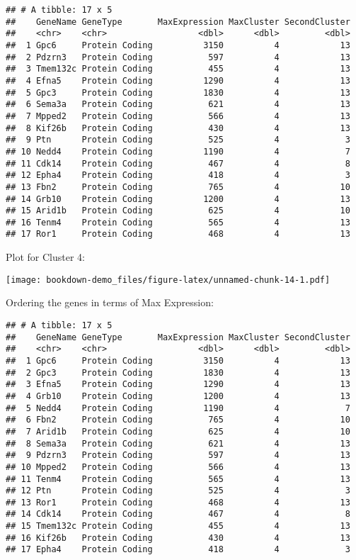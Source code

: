 \documentclass[
]{book}
\begin{document}
\begin{verbatim}
## # A tibble: 17 x 5
##    GeneName GeneType       MaxExpression MaxCluster SecondCluster
##    <chr>    <chr>                  <dbl>      <dbl>         <dbl>
##  1 Gpc6     Protein Coding          3150          4            13
##  2 Pdzrn3   Protein Coding           597          4            13
##  3 Tmem132c Protein Coding           455          4            13
##  4 Efna5    Protein Coding          1290          4            13
##  5 Gpc3     Protein Coding          1830          4            13
##  6 Sema3a   Protein Coding           621          4            13
##  7 Mpped2   Protein Coding           566          4            13
##  8 Kif26b   Protein Coding           430          4            13
##  9 Ptn      Protein Coding           525          4             3
## 10 Nedd4    Protein Coding          1190          4             7
## 11 Cdk14    Protein Coding           467          4             8
## 12 Epha4    Protein Coding           418          4             3
## 13 Fbn2     Protein Coding           765          4            10
## 14 Grb10    Protein Coding          1200          4            13
## 15 Arid1b   Protein Coding           625          4            10
## 16 Tenm4    Protein Coding           565          4            13
## 17 Ror1     Protein Coding           468          4            13
\end{verbatim}

Plot for Cluster 4:

\texttt{[image: bookdown-demo\_files/figure-latex/unnamed-chunk-14-1.pdf]}

Ordering the genes in terms of Max Expression:

\begin{verbatim}
## # A tibble: 17 x 5
##    GeneName GeneType       MaxExpression MaxCluster SecondCluster
##    <chr>    <chr>                  <dbl>      <dbl>         <dbl>
##  1 Gpc6     Protein Coding          3150          4            13
##  2 Gpc3     Protein Coding          1830          4            13
##  3 Efna5    Protein Coding          1290          4            13
##  4 Grb10    Protein Coding          1200          4            13
##  5 Nedd4    Protein Coding          1190          4             7
##  6 Fbn2     Protein Coding           765          4            10
##  7 Arid1b   Protein Coding           625          4            10
##  8 Sema3a   Protein Coding           621          4            13
##  9 Pdzrn3   Protein Coding           597          4            13
## 10 Mpped2   Protein Coding           566          4            13
## 11 Tenm4    Protein Coding           565          4            13
## 12 Ptn      Protein Coding           525          4             3
## 13 Ror1     Protein Coding           468          4            13
## 14 Cdk14    Protein Coding           467          4             8
## 15 Tmem132c Protein Coding           455          4            13
## 16 Kif26b   Protein Coding           430          4            13
## 17 Epha4    Protein Coding           418          4             3
\end{verbatim}
\end{document}
